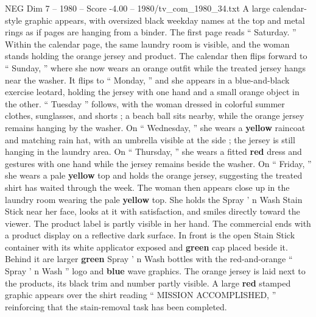 \begin{textsample}{NEG Dim 7 – 1980 – Score -4.00 – 1980/tv\_com\_1980\_34.txt}
A large calendar-style graphic appears, with oversized black weekday names at the top and metal rings as if pages are hanging from a binder.
The first page reads “ Saturday. ” Within the calendar page, the same laundry room is visible, and the woman stands holding the orange jersey and product.
The calendar then flips forward to “ Sunday, ” where she now wears an orange outfit while the treated jersey hangs near the washer.
It flips to “ Monday, ” and she appears in a blue-and-black exercise leotard, holding the jersey with one hand and a small orange object in the other. “ Tuesday ” follows, with the woman dressed in colorful summer clothes, sunglasses, and shorts ; a beach ball sits nearby, while the orange jersey remains hanging by the washer.
On “ Wednesday, ” she wears a \textbf{yellow} raincoat and matching rain hat, with an umbrella visible at the side ; the jersey is still hanging in the laundry area.
On “ Thursday, ” she wears a fitted \textbf{red} dress and gestures with one hand while the jersey remains beside the washer.
On “ Friday, ” she wears a pale \textbf{yellow} top and holds the orange jersey, suggesting the treated shirt has waited through the week.
The woman then appears close up in the laundry room wearing the pale \textbf{yellow} top.
She holds the Spray ’ n Wash Stain Stick near her face, looks at it with satisfaction, and smiles directly toward the viewer.
The product label is partly visible in her hand.
The commercial ends with a product display on a reflective dark surface.
In front is the open Stain Stick container with its white applicator exposed and \textbf{green} cap placed beside it.
Behind it are larger \textbf{green} Spray ’ n Wash bottles with the red-and-orange “ Spray ’ n Wash ” logo and \textbf{blue} wave graphics.
The orange jersey is laid next to the products, its black trim and number partly visible.
A large \textbf{red} stamped graphic appears over the shirt reading “ MISSION ACCOMPLISHED, ” reinforcing that the stain-removal task has been completed.

\end{textsample}
